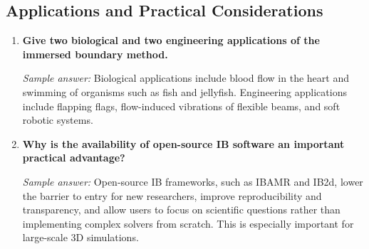 \documentclass[12pt]{article}
\begin{document}
\subsection*{Applications and Practical Considerations}

\begin{enumerate}[resume]
\item \textbf{Give two biological and two engineering applications of the immersed boundary method.}

\textit{Sample answer:}
Biological applications include blood flow in the heart and swimming of organisms such as fish and jellyfish. Engineering applications include flapping flags, flow-induced vibrations of flexible beams, and soft robotic systems.

\item \textbf{Why is the availability of open-source IB software an important practical advantage?}

\textit{Sample answer:}
Open-source IB frameworks, such as IBAMR and IB2d, lower the barrier to entry for new researchers, improve reproducibility and transparency, and allow users to focus on scientific questions rather than implementing complex solvers from scratch. This is especially important for large-scale 3D simulations.
\end{enumerate}
\end{document}
